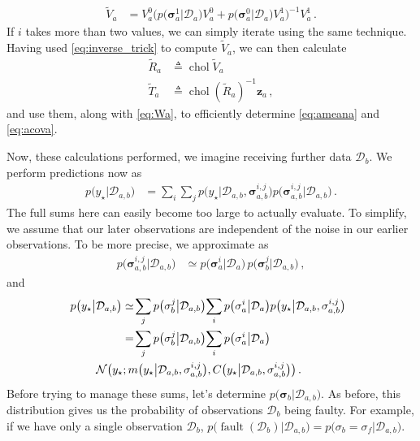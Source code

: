 \documentclass{article}
\newcommand{\cm}[1]{\ensuremath{\mathcal{#1}}}
\newcommand{\bm}[1]{\ensuremath{\mathbf{#1}}}
\newcommand{\data}{\ensuremath{\cm{D}}}
\newcommand{\vect}[1]{\bm{#1}}
\newcommand{\vz}{\vect{z}}
\newcommand{\vs}{\vect{\sigma}}
\newcommand{\p}[2]{p\bigl(#1\big\vert#2\bigr)}
\newcommand{\fPr}{p}
\newcommand{\Prob}[2]{\fPr\bigl(#1\big\vert#2\bigr)}
\newcommand{\mean}[2]{{m}\bigl(#1\big\vert#2\bigr)}
\newcommand{\cov}[2]{{C}\bigl(#1\big\vert#2\bigr)}
\newcommand{\N}[3]{\cm{N}\bigl(#1;#2,#3\bigr)}
\newcommand{\st}{_{\star}}
\newcommand{\defequal}{\triangleq}
\DeclareMathOperator{\fault}{fault}
\DeclareMathOperator{\chol}{chol}
\begin{document}
\begin{align} \label{eq:inverse_trick}
\tilde{V}_a & = V^0_a\bigl(
\Prob{\vs^1_{a}}{\data_a} V^0_a 
+ 
\Prob{\vs^0_{a}}{\data_a} V^1_a
\bigr)^{-1}V^1_a\,.
\end{align}
If $i$ takes more than two values, we can simply iterate using the same technique. Having used \eqref{eq:inverse_trick} to compute $\tilde{V}_a$, we can then calculate
\begin{align}
 \tilde{R}_a & \defequal \chol \tilde{V}_a \label{eq:Ra} \\
 \tilde{T}_a & \defequal \chol (\tilde{R}_a)^{-1} \vz_a \label{eq:Ta} \,,
\end{align}
and use them, along with \eqref{eq:Wa}, to efficiently determine \eqref{eq:ameana} and \eqref{eq:acova}.

Now, these calculations performed, we imagine receiving further data $\data_b$. We perform predictions now as
\begin{align*}
\p{y\st}{\data_{a,b}} & = \sum_{i} \sum_{j} \p{y\st}{\data_{a,b}, \vs^{i,j}_{a,b}} \Prob{\vs^{i,j}_{a,b}}{\data_{a,b}}\,.
\end{align*}
The full sums here can easily become too large to actually evaluate. To simplify, we assume that our later observations are independent of the noise in our earlier observations. To be more precise, we approximate as
\begin{align} \label{eq:approx}
\Prob{\vs^{i,j}_{a,b}}{\data_{a,b}} & \simeq \Prob{\vs^i_{a}}{\data_a}\,\Prob{\vs^j_{b}}{\data_{a,b}}\,,
\end{align}
and
\begin{align}
\hspace{-0.2cm}\p{y\st}{\data_{a,b}} & \simeq \!\sum_{j} \Prob{\vs^j_{b}}{\data_{a,b}}\!\sum_{i} \Prob{\vs^i_{a}}{\data_a} \p{y\st}{\data_{a,b}, \vs^{i,j}_{a,b}}\nonumber\\
& =\!\sum_{j} \Prob{\vs^j_{b}}{\data_{a,b}}\!\sum_{i} \Prob{\vs^i_{a}}{\data_a}\nonumber\\& \hspace{-0.8cm} \N{y\st}{\mean{y\st}{\data_{a,b}, \vs^{i,j}_{a,b}}}{\cov{y\st}{\data_{a,b}, \vs^{i,j}_{a,b}}}\,.\label{eq:sum_o_Gaussians}
\end{align}
Before trying to manage these sums, let's determine $\Prob{\vs_b}{\data_{a,b}}$. As before, this distribution gives us the probability of observations $\data_b$ being faulty. For example, if we have only a single observation $\data_b$,
$
\Prob{\fault(\data_b)}{\data_{a,b}} = \Prob{\sigma_b = \sigma_f}{\data_{a,b}}
$.
\end{document}
